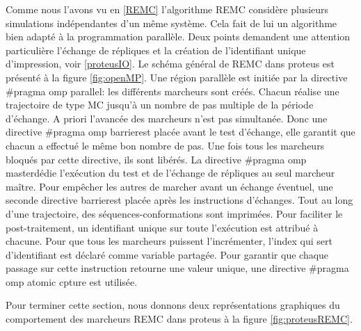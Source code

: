 Comme nous l'avons vu en \ref{REMC} l'algorithme REMC considère plusieurs simulations indépendantes d'un même système. Cela fait de lui un algorithme bien adapté à la programmation parallèle. Deux points demandent une attention particulière l'échange de répliques et la création de l'identifiant unique d'impression, voir \ref{proteusIO}. Le schéma général de REMC dans proteus est présenté à la figure  \ref{fig:openMP}. Une région parallèle est initiée par la directive \og #pragma omp parallel\fg: les différents marcheurs sont créés. Chacun réalise une trajectoire de type MC jusqu'à un nombre de pas multiple de la période d'échange. A priori l'avancée des marcheurs n'est pas simultanée. Donc une directive \og #pragma omp barrier\fg est placée avant le test d'échange, elle garantit que chacun a effectué le même bon nombre de pas. Une fois tous les marcheurs bloqués par cette directive, ils sont libérés. La directive \og #pragma omp master\fg dédie l'exécution du test et de l'échange de répliques au seul marcheur maître. Pour empêcher les autres de marcher avant un échange éventuel, une seconde directive \og barrier\fg est placée après les instructions d'échanges. Tout au long d'une trajectoire, des séquences-conformations sont imprimées. Pour faciliter le post-traitement, un identifiant unique sur toute l'exécution est attribué à chacune. Pour que tous les marcheurs puissent l'incrémenter, l'index qui sert d'identifiant est déclaré comme variable partagée. Pour garantir que chaque passage sur cette instruction retourne une valeur unique, une directive \og#pragma omp atomic cpture \fg est utilisée.


Pour terminer cette section, nous donnons deux représentations graphiques du comportement des marcheurs REMC dans proteus à la figure \ref{fig:proteusREMC}.  

